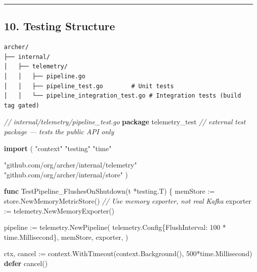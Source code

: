 \documentclass[
]{article}
\newenvironment{Shaded}{}{}
\newcommand{\CommentTok}[1]{\textcolor[rgb]{0.38,0.63,0.69}{\textit{#1}}}
\newcommand{\ControlFlowTok}[1]{\textcolor[rgb]{0.00,0.44,0.13}{\textbf{#1}}}
\newcommand{\DecValTok}[1]{\textcolor[rgb]{0.25,0.63,0.44}{#1}}
\newcommand{\KeywordTok}[1]{\textcolor[rgb]{0.00,0.44,0.13}{\textbf{#1}}}
\newcommand{\NormalTok}[1]{#1}
\newcommand{\OperatorTok}[1]{\textcolor[rgb]{0.40,0.40,0.40}{#1}}
\newcommand{\StringTok}[1]{\textcolor[rgb]{0.25,0.44,0.63}{#1}}
\begin{document}
\begin{center}\rule{0.5\linewidth}{0.5pt}\end{center}

\hypertarget{testing-structure}{%
\subsection{10. Testing Structure}\label{testing-structure}}

\begin{verbatim}
archer/
├── internal/
│   ├── telemetry/
│   │   ├── pipeline.go
│   │   ├── pipeline_test.go        # Unit tests
│   │   └── pipeline_integration_test.go # Integration tests (build tag gated)
\end{verbatim}

\begin{Shaded}
\begin{Highlighting}[]
\CommentTok{// internal/telemetry/pipeline\_test.go}
\KeywordTok{package}\NormalTok{ telemetry\_test  }\CommentTok{// external test package — tests the public API only}

\KeywordTok{import} \OperatorTok{(}
    \StringTok{"context"}
    \StringTok{"testing"}
    \StringTok{"time"}

    \StringTok{"github.com/org/archer/internal/telemetry"}
    \StringTok{"github.com/org/archer/internal/store"}
\OperatorTok{)}

\KeywordTok{func}\NormalTok{ TestPipeline\_FlushesOnShutdown}\OperatorTok{(}\NormalTok{t }\OperatorTok{*}\NormalTok{testing}\OperatorTok{.}\NormalTok{T}\OperatorTok{)} \OperatorTok{\{}
\NormalTok{    memStore }\OperatorTok{:=}\NormalTok{ store}\OperatorTok{.}\NormalTok{NewMemoryMetricStore}\OperatorTok{()}
    \CommentTok{// Use memory exporter, not real Kafka}
\NormalTok{    exporter }\OperatorTok{:=}\NormalTok{ telemetry}\OperatorTok{.}\NormalTok{NewMemoryExporter}\OperatorTok{()}

\NormalTok{    pipeline }\OperatorTok{:=}\NormalTok{ telemetry}\OperatorTok{.}\NormalTok{NewPipeline}\OperatorTok{(}
\NormalTok{        telemetry}\OperatorTok{.}\NormalTok{Config}\OperatorTok{\{}\NormalTok{FlushInterval}\OperatorTok{:} \DecValTok{100} \OperatorTok{*}\NormalTok{ time}\OperatorTok{.}\NormalTok{Millisecond}\OperatorTok{\},}
\NormalTok{        memStore}\OperatorTok{,}
\NormalTok{        exporter}\OperatorTok{,}
    \OperatorTok{)}

\NormalTok{    ctx}\OperatorTok{,}\NormalTok{ cancel }\OperatorTok{:=}\NormalTok{ context}\OperatorTok{.}\NormalTok{WithTimeout}\OperatorTok{(}\NormalTok{context}\OperatorTok{.}\NormalTok{Background}\OperatorTok{(),} \DecValTok{500}\OperatorTok{*}\NormalTok{time}\OperatorTok{.}\NormalTok{Millisecond}\OperatorTok{)}
    \ControlFlowTok{defer}\NormalTok{ cancel}\OperatorTok{()}


\end{Highlighting}
\end{Shaded}
\end{document}
